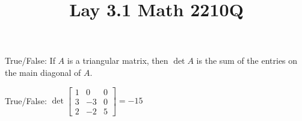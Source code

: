 \documentclass{ximera}
\begin{document}
  	\title{Lay 3.1  \hfill Math 2210Q} 

  \begin{question} True/False: If $A$ is a triangular matrix, then $\det A$ is the sum of the entries on the main diagonal of $A$.
  	
  	\begin{multipleChoice}
  		\end{multipleChoice}
  	
  	\end{question}	
    \begin{question} True/False: $\det \begin{bmatrix} 1& 0&0 \\ 3 &-3 &0 \\ 2&-2&5 \end{bmatrix} = -15$\\
    	
    	\begin{multipleChoice}
    	\end{multipleChoice}
    	
    \end{question}	
\end{document}
